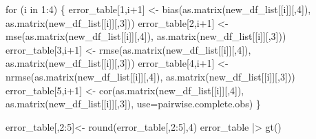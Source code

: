 \documentclass[
  letterpaper,
  DIV=11,
  numbers=noendperiod,
  abstract]{scrartcl}
\newenvironment{Shaded}{\begin{snugshade}}{\end{snugshade}}
\newcommand{\AttributeTok}[1]{\textcolor[rgb]{0.40,0.45,0.13}{#1}}
\newcommand{\ControlFlowTok}[1]{\textcolor[rgb]{0.00,0.23,0.31}{#1}}
\newcommand{\DecValTok}[1]{\textcolor[rgb]{0.68,0.00,0.00}{#1}}
\newcommand{\FunctionTok}[1]{\textcolor[rgb]{0.28,0.35,0.67}{#1}}
\newcommand{\NormalTok}[1]{\textcolor[rgb]{0.00,0.23,0.31}{#1}}
\newcommand{\OtherTok}[1]{\textcolor[rgb]{0.00,0.23,0.31}{#1}}
\newcommand{\SpecialCharTok}[1]{\textcolor[rgb]{0.37,0.37,0.37}{#1}}
\newcommand{\StringTok}[1]{\textcolor[rgb]{0.13,0.47,0.30}{#1}}
\begin{document}
\begin{Shaded}
\begin{Highlighting}[]
\ControlFlowTok{for}\NormalTok{ (i }\ControlFlowTok{in} \DecValTok{1}\SpecialCharTok{:}\DecValTok{4}\NormalTok{) \{}
\NormalTok{  error\_table[}\DecValTok{1}\NormalTok{,i}\SpecialCharTok{+}\DecValTok{1}\NormalTok{] }\OtherTok{\textless{}{-}} \FunctionTok{bias}\NormalTok{(}\FunctionTok{as.matrix}\NormalTok{(new\_df\_list[[i]][,}\DecValTok{4}\NormalTok{]), }
                           \FunctionTok{as.matrix}\NormalTok{(new\_df\_list[[i]][,}\DecValTok{3}\NormalTok{]))}
\NormalTok{  error\_table[}\DecValTok{2}\NormalTok{,i}\SpecialCharTok{+}\DecValTok{1}\NormalTok{] }\OtherTok{\textless{}{-}} \FunctionTok{mse}\NormalTok{(}\FunctionTok{as.matrix}\NormalTok{(new\_df\_list[[i]][,}\DecValTok{4}\NormalTok{]), }
                           \FunctionTok{as.matrix}\NormalTok{(new\_df\_list[[i]][,}\DecValTok{3}\NormalTok{]))}
\NormalTok{  error\_table[}\DecValTok{3}\NormalTok{,i}\SpecialCharTok{+}\DecValTok{1}\NormalTok{] }\OtherTok{\textless{}{-}} \FunctionTok{rmse}\NormalTok{(}\FunctionTok{as.matrix}\NormalTok{(new\_df\_list[[i]][,}\DecValTok{4}\NormalTok{]), }
                           \FunctionTok{as.matrix}\NormalTok{(new\_df\_list[[i]][,}\DecValTok{3}\NormalTok{]))}
\NormalTok{  error\_table[}\DecValTok{4}\NormalTok{,i}\SpecialCharTok{+}\DecValTok{1}\NormalTok{] }\OtherTok{\textless{}{-}} \FunctionTok{nrmse}\NormalTok{(}\FunctionTok{as.matrix}\NormalTok{(new\_df\_list[[i]][,}\DecValTok{4}\NormalTok{]), }
                           \FunctionTok{as.matrix}\NormalTok{(new\_df\_list[[i]][,}\DecValTok{3}\NormalTok{]))}
\NormalTok{  error\_table[}\DecValTok{5}\NormalTok{,i}\SpecialCharTok{+}\DecValTok{1}\NormalTok{] }\OtherTok{\textless{}{-}} \FunctionTok{cor}\NormalTok{(}\FunctionTok{as.matrix}\NormalTok{(new\_df\_list[[i]][,}\DecValTok{4}\NormalTok{]), }
                           \FunctionTok{as.matrix}\NormalTok{(new\_df\_list[[i]][,}\DecValTok{3}\NormalTok{]), }\AttributeTok{use=}\StringTok{\textquotesingle{}pairwise.complete.obs\textquotesingle{}}\NormalTok{)}
\NormalTok{               \}}

\NormalTok{error\_table[,}\DecValTok{2}\SpecialCharTok{:}\DecValTok{5}\NormalTok{]}\OtherTok{\textless{}{-}} \FunctionTok{round}\NormalTok{(error\_table[,}\DecValTok{2}\SpecialCharTok{:}\DecValTok{5}\NormalTok{],}\DecValTok{4}\NormalTok{)}
\NormalTok{error\_table }\SpecialCharTok{|\textgreater{}}  \FunctionTok{gt}\NormalTok{()}
\end{Highlighting}
\end{Shaded}
\end{document}
